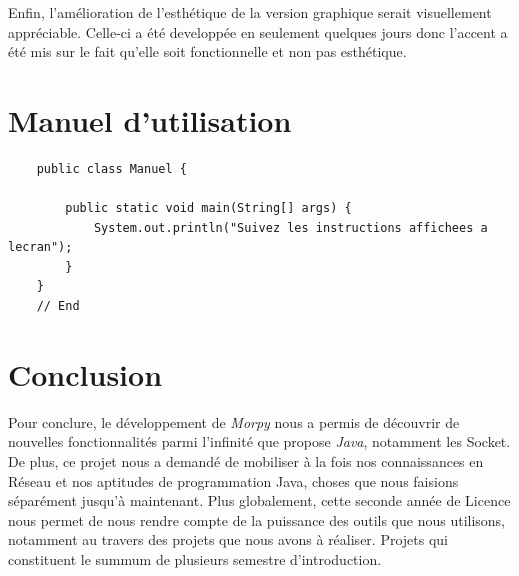 \documentclass{report}
\begin{document}
Enfin, l'amélioration de l'esthétique de la version graphique serait visuellement appréciable. Celle-ci a été developpée en seulement quelques jours donc l'accent a été mis sur le fait qu'elle soit fonctionnelle et non pas esthétique.


\section*{Manuel d'utilisation}

\begin{lstlisting}
    public class Manuel {

        public static void main(String[] args) {
            System.out.println("Suivez les instructions affichees a lecran");
        }
    }
    // End
\end{lstlisting}



\section*{Conclusion}

Pour conclure, le développement de \emph{Morpy} nous a permis de découvrir de nouvelles fonctionnalités parmi l'infinité que propose \emph{Java}, notamment les Socket.
De plus, ce projet nous a demandé de mobiliser à la fois nos connaissances en Réseau et nos aptitudes de programmation Java, choses que nous faisions séparément jusqu'à maintenant. 
Plus globalement, cette seconde année de Licence nous permet de nous rendre compte de la puissance des outils que nous utilisons, notamment au travers des projets que nous avons à réaliser.
Projets qui constituent le summum de plusieurs semestre d'introduction.









\end{document}
